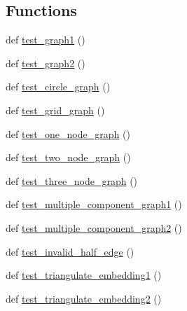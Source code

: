 \subsection*{Functions}
\begin{DoxyCompactItemize}
\item 
def \hyperlink{namespacenetworkx_1_1algorithms_1_1tests_1_1test__planar__drawing_a383e923323b0c84c6d7c6738098f0511}{test\+\_\+graph1} ()
\item 
def \hyperlink{namespacenetworkx_1_1algorithms_1_1tests_1_1test__planar__drawing_a4b9b2e60d9167fd2ff17a27403355792}{test\+\_\+graph2} ()
\item 
def \hyperlink{namespacenetworkx_1_1algorithms_1_1tests_1_1test__planar__drawing_aecac4afe299dbf8f3e0e887c03f531b7}{test\+\_\+circle\+\_\+graph} ()
\item 
def \hyperlink{namespacenetworkx_1_1algorithms_1_1tests_1_1test__planar__drawing_ae99c60ca328e0784af3b1e9ea3791af5}{test\+\_\+grid\+\_\+graph} ()
\item 
def \hyperlink{namespacenetworkx_1_1algorithms_1_1tests_1_1test__planar__drawing_a06252b7ac648dad48bce3ef6e223e411}{test\+\_\+one\+\_\+node\+\_\+graph} ()
\item 
def \hyperlink{namespacenetworkx_1_1algorithms_1_1tests_1_1test__planar__drawing_ac3e4dfec79afa32b0c23bb71a4853d92}{test\+\_\+two\+\_\+node\+\_\+graph} ()
\item 
def \hyperlink{namespacenetworkx_1_1algorithms_1_1tests_1_1test__planar__drawing_a17ff5c28349e6f31fc173733156aea48}{test\+\_\+three\+\_\+node\+\_\+graph} ()
\item 
def \hyperlink{namespacenetworkx_1_1algorithms_1_1tests_1_1test__planar__drawing_a3bec46ee9f0dc89f80ab420ce8a71025}{test\+\_\+multiple\+\_\+component\+\_\+graph1} ()
\item 
def \hyperlink{namespacenetworkx_1_1algorithms_1_1tests_1_1test__planar__drawing_ae4def408c644d949c50443022ae11d11}{test\+\_\+multiple\+\_\+component\+\_\+graph2} ()
\item 
def \hyperlink{namespacenetworkx_1_1algorithms_1_1tests_1_1test__planar__drawing_a3134f3c236706263916f8bd35f9c76a3}{test\+\_\+invalid\+\_\+half\+\_\+edge} ()
\item 
def \hyperlink{namespacenetworkx_1_1algorithms_1_1tests_1_1test__planar__drawing_a84a836aa6acdd3cd94daa3dc058eaed2}{test\+\_\+triangulate\+\_\+embedding1} ()
\item 
def \hyperlink{namespacenetworkx_1_1algorithms_1_1tests_1_1test__planar__drawing_ac5bb4f4868ff85ac1ab9ca11dd838e57}{test\+\_\+triangulate\+\_\+embedding2} ()

\end{DoxyCompactItemize}
